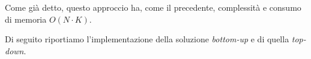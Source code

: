     Come già detto, questo approccio ha, come il precedente, complessità e consumo di memoria $O(N \cdot K)$.
    
    \Codice
    
    Di seguito riportiamo l'implementazione della soluzione \textit{bottom-up} e di quella \textit{top-down}.
    
    \colorbox{white}{}
    
    \colorbox{white}{}